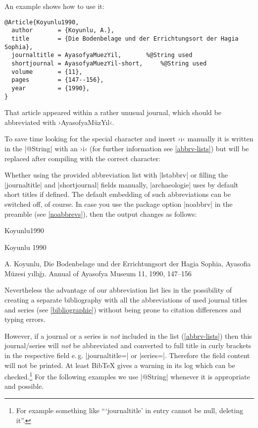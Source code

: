 \documentclass[a4paper,
10pt,
greek,
french,
spanish,
italian,
ngerman,
english
]{ltxdoc}
\begin{document}
An example shows how to use it:
\begin{lstlisting}[style=bibentry,label=Koyunlu1990,caption={{@}Article\{Koyunlu1990,…\} }]
@Article{Koyunlu1990,
  author       = {Koyunlu, A.},
  title        = {Die Bodenbelage und der Errichtungsort der Hagia Sophia},
  journaltitle = AyasofyaMuezYil,		%@String used
  shortjournal = AyasofyaMuezYil-short,		%@String used
  volume       = {11},
  pages        = {147--156},
  year         = {1990},
}
\end{lstlisting}

That article appeared within a rather unusual journal, 
which should be abbreviated with ›AyasofyaMüzYıl‹.

To save  time  looking for the special character and insert ›ı‹ manually 
it is written in the |@String| with an ›i‹ (for further information see \cref{abbrv-lists}) but will be replaced after compiling with the correct character:


Whether using the provided abbreviation list with |lstabbrv| or filling the |journaltitle| and |shortjournal| fields manually, 
|archaeologie| uses by default short titles if defined.
The default embedding of such abbreviations can be switched off, of course.
In case you use the package option |noabbrv| in the preamble (see \cref{noabbrevs}), then the output changes as follows:
\begin{bibbsp}{Koyunlu1990}
\parbox[t]{2cm}{Koyunlu 1990} \parbox[t]{9cm}{A. Koyunlu, 
Die Bodenbelage und der Errichtungsort der Hagia Sophia, {\color{red}Ayasofia Müzesi yıllığı. Annual of Ayasofya Museum} 11, 1990, 147–156}
\end{bibbsp}
Nevertheless the advantage of our abbreviation list lies in the possibility of creating a separate bibliography 
with all the abbreviations of used journal titles and series (see \cref{bibliographie}) without being prone to citation differences and typing errors.

However, if a journal or a series is \emph{not} included in the list (\cref{abbrv-lists}) 
then this journal/series will \emph{not} be abbreviated and converted to full title in curly brackets in the respective field e.\,g. |journaltitle=| or |series=|. 
Therefore the field content will not be printed. 
At least Bib\TeX{} gives a warning in its log which can be checked.\footnote{For example something like \enquote{\enquote{journaltitle} in entry  cannot be null, deleting it}.}
For the following examples we use |@String| whenever it is appropriate and possible.
\end{document}
